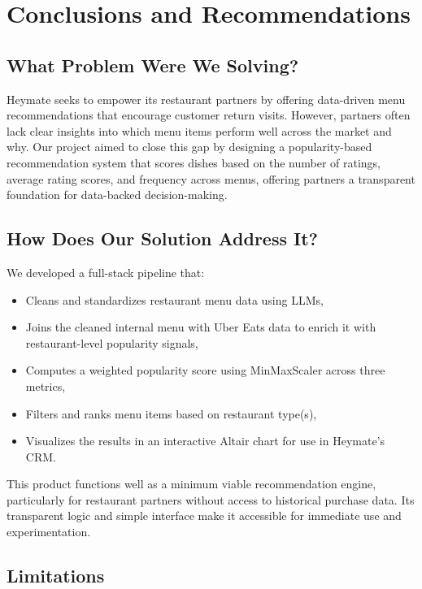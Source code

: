 \documentclass[
  11pt,
  a4paper,
  DIV=11,
  numbers=noendperiod]{scrartcl}
\providecommand{\tightlist}{%
  \setlength{\itemsep}{0pt}\setlength{\parskip}{0pt}}\usepackage{longtable,booktabs,array}
\begin{document}
\section{Conclusions and
Recommendations}\label{conclusions-and-recommendations}

\subsection{What Problem Were We
Solving?}\label{what-problem-were-we-solving}

Heymate seeks to empower its restaurant partners by offering data-driven
menu recommendations that encourage customer return visits. However,
partners often lack clear insights into which menu items perform well
across the market and why. Our project aimed to close this gap by
designing a popularity-based recommendation system that scores dishes
based on the number of ratings, average rating scores, and frequency
across menus, offering partners a transparent foundation for data-backed
decision-making.

\subsection{How Does Our Solution Address
It?}\label{how-does-our-solution-address-it}

We developed a full-stack pipeline that:

\begin{itemize}
\tightlist
\item
  Cleans and standardizes restaurant menu data using LLMs,
\item
  Joins the cleaned internal menu with Uber Eats data to enrich it with
  restaurant-level popularity signals,
\item
  Computes a weighted popularity score using MinMaxScaler across three
  metrics,
\item
  Filters and ranks menu items based on restaurant type(s),
\item
  Visualizes the results in an interactive Altair chart for use in
  Heymate's CRM.
\end{itemize}

This product functions well as a minimum viable recommendation engine,
particularly for restaurant partners without access to historical
purchase data. Its transparent logic and simple interface make it
accessible for immediate use and experimentation.

\subsection{Limitations}\label{limitations-1}
\end{document}
